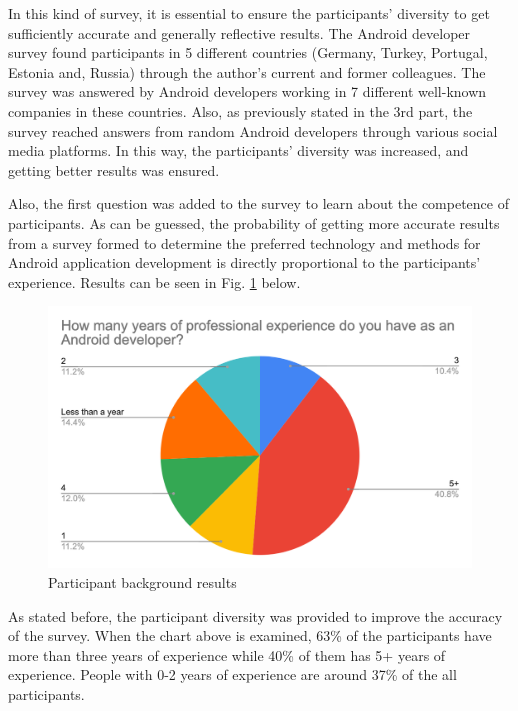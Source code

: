 In this kind of survey, it is essential to ensure the participants’ diversity to get sufficiently accurate and generally reflective results. The Android developer survey found participants in 5 different countries (Germany, Turkey, Portugal, Estonia and, Russia) through the author's current and former colleagues. The survey was answered by Android developers working in 7 different well-known companies in these countries. Also, as previously stated in the 3rd part, the survey reached answers from random Android developers through various social media platforms. In this way, the participants’ diversity was increased, and getting better results was ensured. 

Also, the first question was added to the survey to learn about the competence of participants. As can be guessed, the probability of getting more accurate results from a survey formed to determine the preferred technology and methods for Android application development is directly proportional to the participants’ experience. Results can be seen in Fig. \ref{fig:participant_bg} below.
\begin{figure}[ht!]
    \centering
    \includegraphics[scale=0.25]{figures/dev_experience.png}
    \caption{Participant background results}
    \label{fig:participant_bg}
\end{figure}
\FloatBarrier

As stated before, the participant diversity was provided to improve the accuracy of the survey. When the chart above is examined, 63\% of the participants have more than three years of experience while 40\% of them has 5+ years of experience. People with 0-2 years of experience are around 37\% of the all participants.